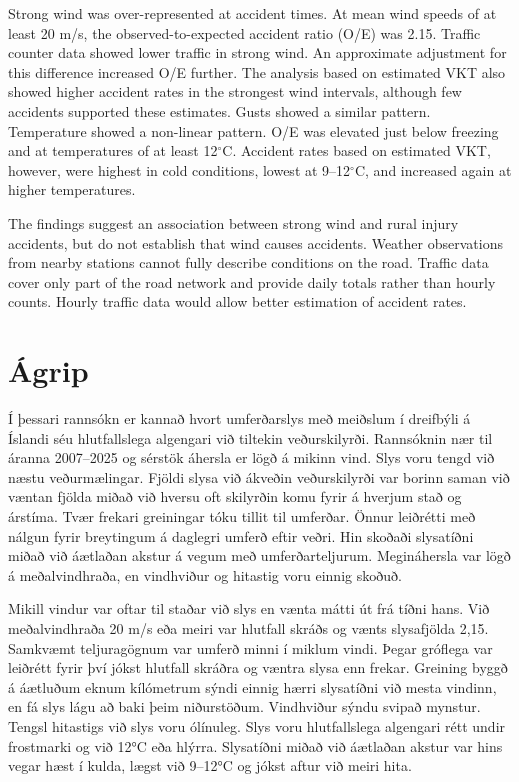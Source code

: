 \documentclass[a4paper,12pt,oneside,open=any,numbers=noenddot]{scrbook}
\begin{document}
Strong wind was over-represented at accident times. At mean wind speeds of at least 20 m/s, the observed-to-expected accident ratio (O/E) was 2.15. Traffic counter data showed lower traffic in strong wind. An approximate adjustment for this difference increased O/E further. The analysis based on estimated VKT also showed higher accident rates in the strongest wind intervals, although few accidents supported these estimates. Gusts showed a similar pattern. Temperature showed a non-linear pattern. O/E was elevated just below freezing and at temperatures of at least 12$^{\circ}$C. Accident rates based on estimated VKT, however, were highest in cold conditions, lowest at 9--12$^{\circ}$C, and increased again at higher temperatures.

The findings suggest an association between strong wind and rural injury accidents, but do not establish that wind causes accidents. Weather observations from nearby stations cannot fully describe conditions on the road. Traffic data cover only part of the road network and provide daily totals rather than hourly counts. Hourly traffic data would allow better estimation of accident rates.
\newpage
\section*{Ágrip}

Í þessari rannsókn er kannað hvort umferðarslys með meiðslum í dreifbýli á Íslandi séu hlutfallslega algengari við tiltekin veðurskilyrði. Rannsóknin nær til áranna 2007–2025 og sérstök áhersla er lögð á mikinn vind.
 Slys voru tengd við næstu veðurmælingar. Fjöldi slysa við ákveðin veðurskilyrði var borinn saman við væntan fjölda miðað við hversu oft skilyrðin komu fyrir á hverjum stað og árstíma. Tvær frekari greiningar tóku tillit til umferðar. Önnur leiðrétti með nálgun fyrir breytingum á daglegri umferð eftir veðri. Hin skoðaði slysatíðni miðað við áætlaðan akstur á vegum með umferðarteljurum. Megináhersla var lögð á meðalvindhraða, en vindhviður og hitastig voru einnig skoðuð.

Mikill vindur var oftar til staðar við slys en vænta mátti út frá tíðni hans. Við meðalvindhraða 20 m/s eða meiri var hlutfall skráðs og vænts slysafjölda 2,15. Samkvæmt teljuragögnum var umferð minni í miklum vindi. Þegar gróflega var leiðrétt fyrir því jókst hlutfall skráðra og væntra slysa enn frekar. Greining byggð á áætluðum eknum kílómetrum sýndi einnig hærri slysatíðni við mesta vindinn, en fá slys lágu að baki þeim niðurstöðum. Vindhviður sýndu svipað mynstur. Tengsl hitastigs við slys voru ólínuleg. Slys voru hlutfallslega algengari rétt undir frostmarki og við 12°C eða hlýrra. Slysatíðni miðað við áætlaðan akstur var hins vegar hæst í kulda, lægst við 9–12°C og jókst aftur við meiri hita.
\end{document}
